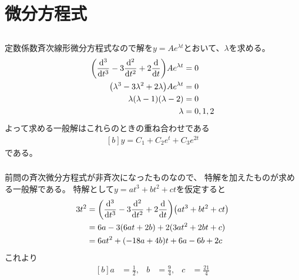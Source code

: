 \documentclass[../ap_2014.tex]{subfiles}
\begin{document}
\setcounter{chapter}{1}
\chapter{微分方程式}
\section{}
\subsection{}
定数係数斉次線形微分方程式なので解を\(y=Ae^{\lambda t}\)とおいて、\(\lambda\)を求める。
\begin{equation}\begin{aligned}[b]
    \qty(\dv[3]{t}-3\dv[2]{t}+2\dv{t})Ae^{\lambda t} &= 0\\
    \qty(\lambda^3-3\lambda^2+2\lambda)Ae^{\lambda t} &= 0\\
    \lambda(\lambda-1)(\lambda-2) &= 0\\
    \lambda &= 0, 1, 2
\end{aligned}\end{equation}
よって求める一般解はこれらのときの重ね合わせである
\begin{equation}\begin{aligned}[b]
    y = C_1 + C_2e^{t}+C_3e^{2t}
\end{aligned}\end{equation}
である。

\subsection{}
前問の斉次微分方程式が非斉次になったものなので、
特解を加えたものが求める一般解である。
特解として\(y = at^3+bt^2+ct\)を仮定すると
\begin{equation}\begin{aligned}[b]
    3t^2 &= \qty(\dv[3]{t}-3\dv[2]{t}+2\dv{t})\qty(at^3+bt^2+ct)\\
    &= 6a-3(6at+2b)+2(3at^2+2bt+c)\\
    &= 6at^2 +(-18a+4b)t+6a-6b+2c
\end{aligned}\end{equation}
これより
\begin{equation}\begin{aligned}[b]
    a &= \frac{1}{2}, & b &= \frac{9}{4}, & c &=\frac{21}{4}
\end{aligned}\end{equation}
\end{document}
